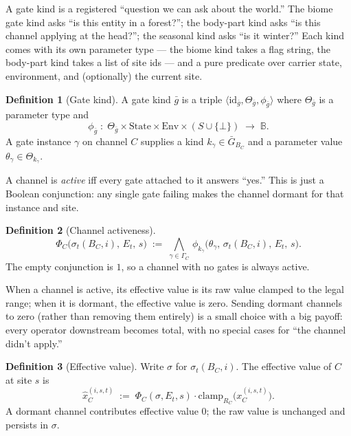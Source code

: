 \documentclass[journal,onecolumn,11pt]{IEEEtran}
\theoremstyle{definition}
\newtheorem{definition}{Definition}
\begin{document}
A gate kind is a registered ``question we can ask about the world.'' The biome gate kind asks ``is this entity in a forest?''; the body-part kind asks ``is this channel applying at the head?''; the seasonal kind asks ``is it winter?'' Each kind comes with its own parameter type --- the biome kind takes a flag string, the body-part kind takes a list of site ids --- and a pure predicate over carrier state, environment, and (optionally) the current site.

\begin{definition}[Gate kind]
A gate kind $\bar{g}$ is a triple $\langle \mathrm{id}_{\bar{g}}, \Theta_{\bar{g}}, \phi_{\bar{g}}\rangle$ where $\Theta_{\bar{g}}$ is a parameter type and
\[
\phi_{\bar{g}} \;:\; \Theta_{\bar{g}} \times \mathrm{State} \times \mathrm{Env} \times (S \cup \{\bot\}) \;\to\; \mathbb{B}.
\]
A gate instance $\gamma$ on channel $C$ supplies a kind $k_\gamma \in \bar{G}_{B_C}$ and a parameter value $\theta_\gamma \in \Theta_{k_\gamma}$.
\end{definition}

A channel is \emph{active} iff every gate attached to it answers ``yes.'' This is just a Boolean conjunction: any single gate failing makes the channel dormant for that instance and site.

\begin{definition}[Channel activeness]
\[
\Phi_C\bigl(\sigma_t(B_C,i),\, E_t,\, s\bigr) \;:=\; \bigwedge_{\gamma \in \Gamma_C}\, \phi_{k_\gamma}\!\bigl(\theta_\gamma,\, \sigma_t(B_C,i),\, E_t,\, s\bigr).
\]
The empty conjunction is $1$, so a channel with no gates is always active.
\end{definition}

When a channel is active, its effective value is its raw value clamped to the legal range; when it is dormant, the effective value is zero. Sending dormant channels to zero (rather than removing them entirely) is a small choice with a big payoff: every operator downstream becomes total, with no special cases for ``the channel didn't apply.''

\begin{definition}[Effective value]\label{def:effective}
Write $\sigma$ for $\sigma_t(B_C,i)$. The effective value of $C$ at site $s$ is
\[
\hat{x}_C^{(i,s,t)} \;:=\; \Phi_C(\sigma,E_t,s) \cdot \mathrm{clamp}_{R_C}\!\bigl(x_C^{(i,s,t)}\bigr).
\]
A dormant channel contributes effective value $0$; the raw value is unchanged and persists in $\sigma$.
\end{definition}
\end{document}
